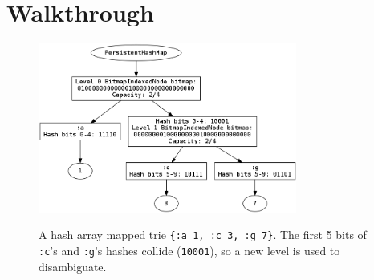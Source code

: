 \documentclass[preprint]{sigplanconf}
\begin{document}
\section{Walkthrough}
\label{walkthrough}

\begin{figure}
\includegraphics[width=8.5cm]{a-c-g-tree}
\label{port-visualize}
\caption{A hash array mapped trie \texttt{\{:a 1, :c 3, :g 7\}}.
The first 5 bits of \texttt{:c}'s and \texttt{:g}'s hashes
collide (\texttt{10001}), so a new level is used to disambiguate.
}
\end{figure}

\end{document}
